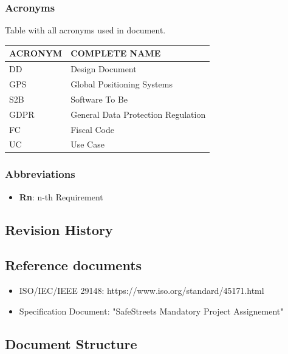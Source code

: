 \documentclass{article}
\begin{document}
\subsubsection{Acronyms}
Table with all acronyms used in document.
\begin{center}
\begin{tabular}{ | l | l |}
    \hline
    ACRONYM & COMPLETE NAME \\
    \hline
    DD & Design Document \\
    \hline
    GPS & Global Positioning Systems \\
    \hline
    S2B & Software To Be \\
    \hline
    GDPR & General Data Protection Regulation \\
    \hline 
    FC & Fiscal Code \\
    \hline
    UC & Use Case \\
    \hline
\end{tabular}
\end{center}

\subsubsection{Abbreviations}
\begin{itemize}
    \item \textbf{Rn}: n-th Requirement 
\end{itemize}

\subsection{Revision History}

\subsection{Reference documents}
\begin{itemize}
    \item ISO/IEC/IEEE 29148: https://www.iso.org/standard/45171.html
    \item Specification Document: "SafeStreets Mandatory Project Assignement"
\end{itemize}

\subsection{Document Structure}
\begin{itemize}
\end{itemize}
\end{document}
